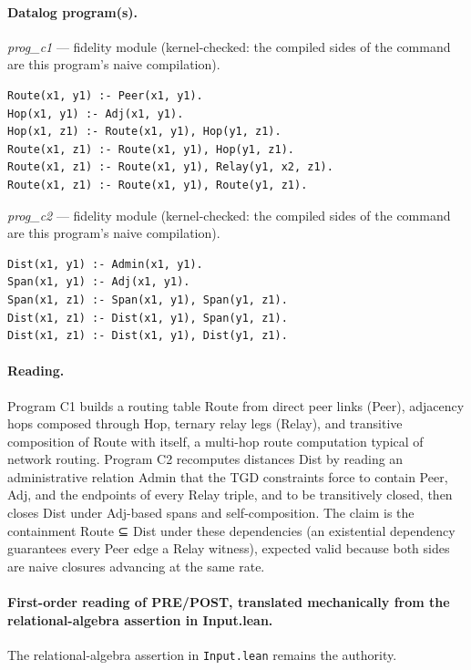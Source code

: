 \documentclass[10pt]{article}
\begin{document}
\paragraph{Datalog program(s).}

{\raggedright\textit{prog\_c1} --- fidelity module (kernel-checked: the compiled sides of the command are this program's naive compilation).\par}

\begin{Verbatim}[fontsize=\scriptsize,breaklines=true,breakanywhere=true,frame=single,framesep=1.5mm]
Route(x1, y1) :- Peer(x1, y1).
Hop(x1, y1) :- Adj(x1, y1).
Hop(x1, z1) :- Route(x1, y1), Hop(y1, z1).
Route(x1, z1) :- Route(x1, y1), Hop(y1, z1).
Route(x1, z1) :- Route(x1, y1), Relay(y1, x2, z1).
Route(x1, z1) :- Route(x1, y1), Route(y1, z1).
\end{Verbatim}

{\raggedright\textit{prog\_c2} --- fidelity module (kernel-checked: the compiled sides of the command are this program's naive compilation).\par}

\begin{Verbatim}[fontsize=\scriptsize,breaklines=true,breakanywhere=true,frame=single,framesep=1.5mm]
Dist(x1, y1) :- Admin(x1, y1).
Span(x1, y1) :- Adj(x1, y1).
Span(x1, z1) :- Span(x1, y1), Span(y1, z1).
Dist(x1, z1) :- Dist(x1, y1), Span(y1, z1).
Dist(x1, z1) :- Dist(x1, y1), Dist(y1, z1).
\end{Verbatim}

\paragraph{Reading.} Program C1 builds a routing table Route from direct peer links (Peer), adjacency hops composed through Hop, ternary relay legs (Relay), and transitive composition of Route with itself, a multi-hop route computation typical of network routing. Program C2 recomputes distances Dist by reading an administrative relation Admin that the TGD constraints force to contain Peer, Adj, and the endpoints of every Relay triple, and to be transitively closed, then closes Dist under Adj-based spans and self-composition. The claim is the containment Route ⊆ Dist under these dependencies (an existential dependency guarantees every Peer edge a Relay witness), expected valid because both sides are naive closures advancing at the same rate.

\paragraph{First-order reading of PRE/POST, translated mechanically from the relational-algebra assertion in Input.lean.} The relational-algebra assertion in \texttt{Input.lean} remains the authority.
\end{document}

